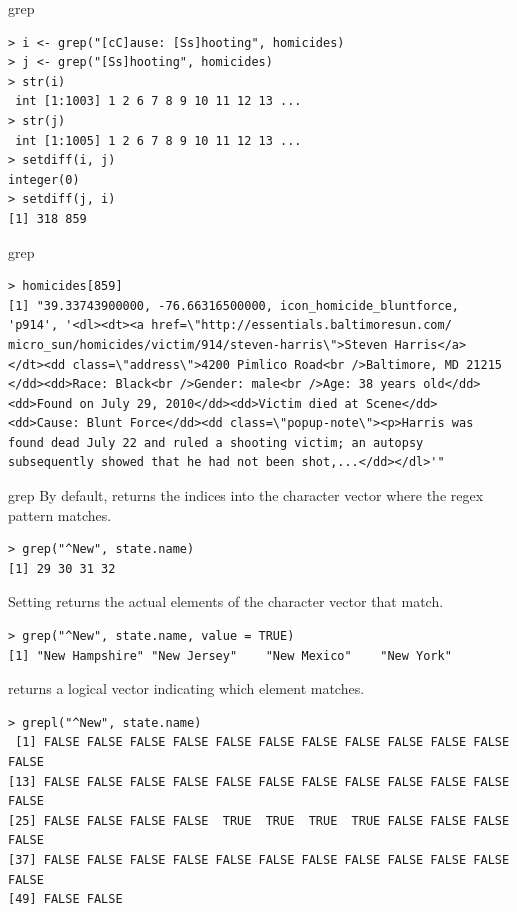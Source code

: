 \documentclass[aspectratio=169]{beamer}
\begin{document}
\begin{frame}[fragile]{grep}
\begin{verbatim}
> i <- grep("[cC]ause: [Ss]hooting", homicides)
> j <- grep("[Ss]hooting", homicides)
> str(i)
 int [1:1003] 1 2 6 7 8 9 10 11 12 13 ...
> str(j)
 int [1:1005] 1 2 6 7 8 9 10 11 12 13 ...
> setdiff(i, j)
integer(0)
> setdiff(j, i)
[1] 318 859
\end{verbatim}
\end{frame}


\begin{frame}[fragile]{grep}
\begin{verbatim}
> homicides[859]
[1] "39.33743900000, -76.66316500000, icon_homicide_bluntforce,
'p914', '<dl><dt><a href=\"http://essentials.baltimoresun.com/
micro_sun/homicides/victim/914/steven-harris\">Steven Harris</a>
</dt><dd class=\"address\">4200 Pimlico Road<br />Baltimore, MD 21215
</dd><dd>Race: Black<br />Gender: male<br />Age: 38 years old</dd>
<dd>Found on July 29, 2010</dd><dd>Victim died at Scene</dd>
<dd>Cause: Blunt Force</dd><dd class=\"popup-note\"><p>Harris was 
found dead July 22 and ruled a shooting victim; an autopsy
subsequently showed that he had not been shot,...</dd></dl>'"
\end{verbatim}
\end{frame}


\begin{frame}[fragile]{grep}
By default,  returns the indices into the character vector
where the regex pattern matches. 
\begin{verbatim}
> grep("^New", state.name)
[1] 29 30 31 32
\end{verbatim}
Setting  returns
the actual elements of the character vector that match.
\begin{verbatim}
> grep("^New", state.name, value = TRUE)
[1] "New Hampshire" "New Jersey"    "New Mexico"    "New York" 
\end{verbatim}
 returns a logical vector indicating which element matches.
\begin{verbatim}
> grepl("^New", state.name)
 [1] FALSE FALSE FALSE FALSE FALSE FALSE FALSE FALSE FALSE FALSE FALSE FALSE
[13] FALSE FALSE FALSE FALSE FALSE FALSE FALSE FALSE FALSE FALSE FALSE FALSE
[25] FALSE FALSE FALSE FALSE  TRUE  TRUE  TRUE  TRUE FALSE FALSE FALSE FALSE
[37] FALSE FALSE FALSE FALSE FALSE FALSE FALSE FALSE FALSE FALSE FALSE FALSE
[49] FALSE FALSE
\end{verbatim}
\end{frame}
\end{document}
